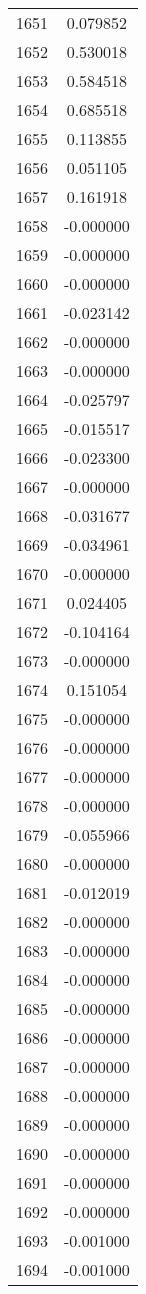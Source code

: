 \documentclass[12pt]{article}
\begin{document}
\begin{longtable}{@{}cc@{}}
1651 & 0.079852 \\
1652 & 0.530018 \\
1653 & 0.584518 \\
1654 & 0.685518 \\
1655 & 0.113855 \\
1656 & 0.051105 \\
1657 & 0.161918 \\
1658 & -0.000000 \\
1659 & -0.000000 \\
1660 & -0.000000 \\
1661 & -0.023142 \\
1662 & -0.000000 \\
1663 & -0.000000 \\
1664 & -0.025797 \\
1665 & -0.015517 \\
1666 & -0.023300 \\
1667 & -0.000000 \\
1668 & -0.031677 \\
1669 & -0.034961 \\
1670 & -0.000000 \\
1671 & 0.024405 \\
1672 & -0.104164 \\
1673 & -0.000000 \\
1674 & 0.151054 \\
1675 & -0.000000 \\
1676 & -0.000000 \\
1677 & -0.000000 \\
1678 & -0.000000 \\
1679 & -0.055966 \\
1680 & -0.000000 \\
1681 & -0.012019 \\
1682 & -0.000000 \\
1683 & -0.000000 \\
1684 & -0.000000 \\
1685 & -0.000000 \\
1686 & -0.000000 \\
1687 & -0.000000 \\
1688 & -0.000000 \\
1689 & -0.000000 \\
1690 & -0.000000 \\
1691 & -0.000000 \\
1692 & -0.000000 \\
1693 & -0.001000 \\
1694 & -0.001000 \\

\end{longtable}
\end{document}
